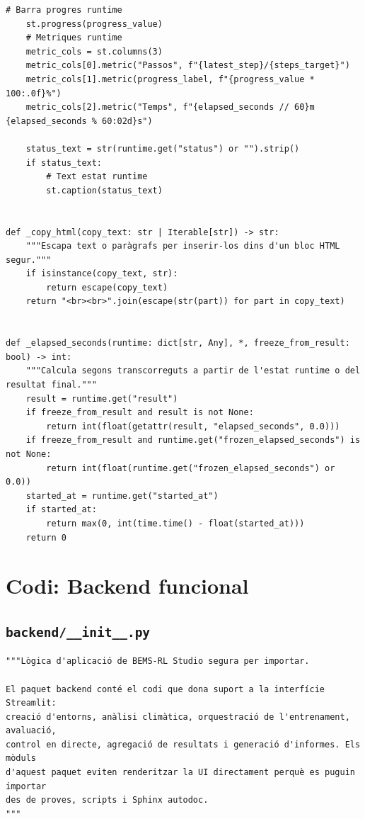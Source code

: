 \documentclass[10pt,a4paper]{article}
\begin{document}
\begin{lstlisting}[style=studioPython,caption={page\_components/ui\_fragments.py},label={lst:page-components-ui-fragments-py}]
    # Barra progres runtime
    st.progress(progress_value)
    # Metriques runtime
    metric_cols = st.columns(3)
    metric_cols[0].metric("Passos", f"{latest_step}/{steps_target}")
    metric_cols[1].metric(progress_label, f"{progress_value * 100:.0f}%")
    metric_cols[2].metric("Temps", f"{elapsed_seconds // 60}m {elapsed_seconds % 60:02d}s")

    status_text = str(runtime.get("status") or "").strip()
    if status_text:
        # Text estat runtime
        st.caption(status_text)


def _copy_html(copy_text: str | Iterable[str]) -> str:
    """Escapa text o paràgrafs per inserir-los dins d'un bloc HTML segur."""
    if isinstance(copy_text, str):
        return escape(copy_text)
    return "<br><br>".join(escape(str(part)) for part in copy_text)


def _elapsed_seconds(runtime: dict[str, Any], *, freeze_from_result: bool) -> int:
    """Calcula segons transcorreguts a partir de l'estat runtime o del resultat final."""
    result = runtime.get("result")
    if freeze_from_result and result is not None:
        return int(float(getattr(result, "elapsed_seconds", 0.0)))
    if freeze_from_result and runtime.get("frozen_elapsed_seconds") is not None:
        return int(float(runtime.get("frozen_elapsed_seconds") or 0.0))
    started_at = runtime.get("started_at")
    if started_at:
        return max(0, int(time.time() - float(started_at)))
    return 0
\end{lstlisting}

\section{Codi: Backend funcional}


\subsection{\texorpdfstring{\texttt{backend/\_\_init\_\_.py}}{backend/\_\_init\_\_.py}}

\begin{lstlisting}[style=studioPython,caption={backend/\_\_init\_\_.py},label={lst:backend---init---py}]
"""Lògica d'aplicació de BEMS-RL Studio segura per importar.

El paquet backend conté el codi que dona suport a la interfície Streamlit:
creació d'entorns, anàlisi climàtica, orquestració de l'entrenament, avaluació,
control en directe, agregació de resultats i generació d'informes. Els mòduls
d'aquest paquet eviten renderitzar la UI directament perquè es puguin importar
des de proves, scripts i Sphinx autodoc.
"""
\end{lstlisting}
\end{document}
